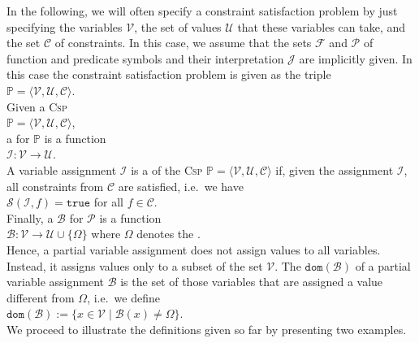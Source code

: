 In the following, we will often specify a constraint satisfaction problem by just specifying the variables
$\mathcal{V}$,  the set of values $\mathcal{U}$ that these variables can take, and the set $\mathcal{C}$ of
constraints.  In this case, we assume that the sets $\mathcal{F}$ and $\mathcal{P}$ of function and predicate
symbols and their interpretation $\mathcal{J}$ are implicitly given.  In this case the constraint satisfaction
problem is given as the triple 
\\[0.2cm]
\hspace*{1.3cm}
$\mathbb{P} = \langle \mathcal{V}, \mathcal{U}, \mathcal{C} \rangle$.
\\[0.2cm]
Given a \textsc{Csp}
\\[0.2cm]
\hspace*{1.3cm}
 $\mathbb{P} = \langle \mathcal{V}, \mathcal{U}, \mathcal{C} \rangle$, 
\\[0.2cm]
a  for $\mathbb{P}$ is a function
\\[0.2cm]
\hspace*{1.3cm}
$\mathcal{I}: \mathcal{V} \rightarrow \mathcal{U}$.
\\[0.2cm]
A variable assignment $\mathcal{I}$ is a  of the \textsc{Csp}
$\mathbb{P}= \langle \mathcal{V}, \mathcal{U}, \mathcal{C} \rangle$ 
if, given the assignment $\mathcal{I}$, all constraints from $\mathcal{C}$ are satisfied, i.e.~we have
\\[0.2cm]
\hspace*{1.3cm}
$\mathcal{S}(\mathcal{I}, f) = \mathtt{true}$ \quad for all $f \in \mathcal{C}$.
\\[0.2cm]
Finally, a   $\mathcal{B}$ for $\mathcal{P}$ is a function
\\[0.2cm]
\hspace*{1.3cm}
$\mathcal{B}: \mathcal{V} \rightarrow \mathcal{U} \cup \{ \Omega \}$ \quad where $\Omega$ denotes the
. 
\\[0.2cm]
Hence, a partial variable assignment does not assign values to all variables.  Instead, it assigns values only
to a subset of the set $\mathcal{V}$.  The  $\mathtt{dom}(\mathcal{B})$  of a partial variable assignment $\mathcal{B}$ is the
set of those variables that are assigned a value different from $\Omega$, i.e.~we define
\\[0.2cm]
\hspace*{1.3cm}
$\mathtt{dom}(\mathcal{B}) := \bigl\{ x \in \mathcal{V} \mid \mathcal{B}(x) \not= \Omega \bigr\}$.
\\[0.2cm]
We proceed to illustrate the definitions given so far by presenting two examples.


